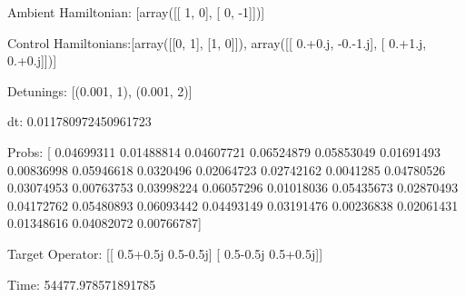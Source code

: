 \documentclass{article}
\begin{document}
    

\newpage

Ambient Hamiltonian: [array([[ 1,  0],
       [ 0, -1]])]

Control Hamiltonians:[array([[0, 1],
       [1, 0]]), array([[ 0.+0.j, -0.-1.j],
       [ 0.+1.j,  0.+0.j]])]

Detunings: [(0.001, 1), (0.001, 2)]

 dt: 0.011780972450961723

Probs: [ 0.04699311  0.01488814  0.04607721  0.06524879  0.05853049  0.01691493
  0.00836998  0.05946618  0.0320496   0.02064723  0.02742162  0.0041285
  0.04780526  0.03074953  0.00763753  0.03998224  0.06057296  0.01018036
  0.05435673  0.02870493  0.04172762  0.05480893  0.06093442  0.04493149
  0.03191476  0.00236838  0.02061431  0.01348616  0.04082072  0.00766787]

Target Operator: [[ 0.5+0.5j  0.5-0.5j]
 [ 0.5-0.5j  0.5+0.5j]]

Time: 54477.978571891785
\end{document}
